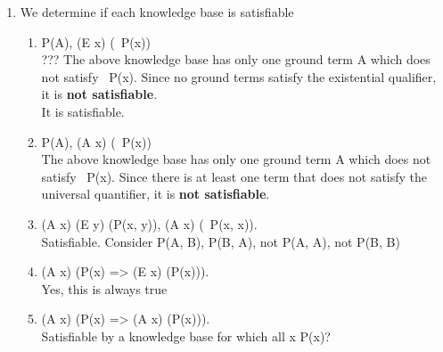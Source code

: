 \documentclass[12pt]{article}
\begin{document}
\begin{enumerate}
	\item We determine if each knowledge base is satisfiable
		\begin{enumerate}
			\item P(A), (E x) (~P(x)) \\
				??? The above knowledge base has only one ground term A which does not satisfy ~P(x). Since no ground terms satisfy the existential qualifier, it is \textbf{not satisfiable}. \\
				It is satisfiable.
			\item P(A), (A x) (~P(x)) \\
				The above knowledge base has only one ground term A which does not satisfy ~P(x). Since there is at least one term that does not satisfy the universal quantifier, it is \textbf{not satisfiable}.
			\item (A x) (E y) (P(x, y)), (A x) (~P(x, x)). \\
				Satisfiable. Consider P(A, B), P(B, A), not P(A, A), not P(B, B)
			\item (A x) (P(x) => (E x) (P(x))). \\
				Yes, this is always true
			\item (A x) (P(x) => (A x) (P(x))). \\
				Satisfiable by a knowledge base for which all x P(x)?
		\end{enumerate}
				

\end{enumerate}
\end{document}
